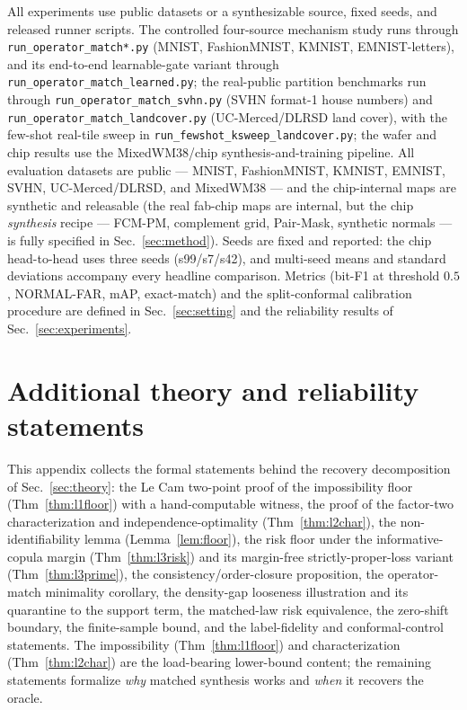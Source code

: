 \documentclass[11pt]{article}
\begin{document}
All experiments use public datasets or a synthesizable source, fixed seeds, and released
runner scripts. The controlled four-source mechanism study runs through
\texttt{run\_operator\_match*.py} (MNIST, FashionMNIST, KMNIST, EMNIST-letters), and its
end-to-end learnable-gate variant through \texttt{run\_operator\_match\_learned.py}; the
real-public partition benchmarks run through \texttt{run\_operator\_match\_svhn.py} (SVHN
format-1 house numbers) and \texttt{run\_operator\_match\_landcover.py}
(UC-Merced/DLRSD land cover), with the few-shot real-tile sweep in
\texttt{run\_fewshot\_ksweep\_landcover.py}; the wafer and chip results use the
MixedWM38/chip synthesis-and-training pipeline. All evaluation datasets are public ---
MNIST, FashionMNIST, KMNIST, EMNIST, SVHN, UC-Merced/DLRSD, and MixedWM38 --- and the
chip-internal maps are synthetic and releasable (the real fab-chip maps are internal,
but the chip \emph{synthesis} recipe --- FCM-PM, complement grid, Pair-Mask, synthetic
normals --- is fully specified in Sec.~\ref{sec:method}). Seeds are fixed and reported:
the chip head-to-head uses three seeds (s99/s7/s42), and multi-seed means and standard
deviations accompany every headline comparison. Metrics (bit-F1 at threshold $0.5$,
NORMAL-FAR, mAP, exact-match) and the split-conformal calibration procedure are defined
in Sec.~\ref{sec:setting} and the reliability results of Sec.~\ref{sec:experiments}.

\appendix
\section{Additional theory and reliability statements}\label{app:theory}

This appendix collects the formal statements behind the recovery decomposition of
Sec.~\ref{sec:theory}: the Le Cam two-point proof of the impossibility floor
(Thm~\ref{thm:l1floor}) with a hand-computable witness, the proof of the factor-two
characterization and independence-optimality (Thm~\ref{thm:l2char}), the non-identifiability
lemma (Lemma~\ref{lem:floor}), the risk floor under the informative-copula margin
(Thm~\ref{thm:l3risk}) and its margin-free strictly-proper-loss variant (Thm~\ref{thm:l3prime}),
the consistency/order-closure proposition, the operator-match minimality corollary, the
density-gap looseness illustration and its quarantine to the support term, the matched-law risk
equivalence, the zero-shift boundary, the finite-sample bound, and the label-fidelity and
conformal-control statements. The impossibility (Thm~\ref{thm:l1floor}) and characterization
(Thm~\ref{thm:l2char}) are the load-bearing lower-bound content; the remaining statements
formalize \emph{why} matched synthesis works and \emph{when} it recovers the oracle.
\end{document}
